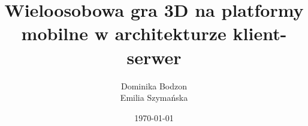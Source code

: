 \documentclass{mini}
\title{Wieloosobowa gra 3D na platformy mobilne w architekturze klient-serwer}
\author{Dominika Bodzon\\Emilia Szyma{\'n}ska}
\date{\today}
\begin{document}
\maketitle




\tableofcontents

%










\listoffigures

\makestatement
\end{document}
